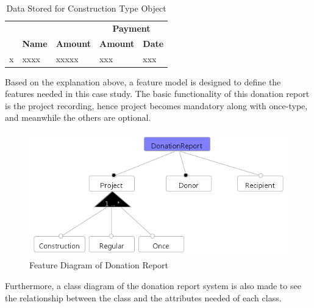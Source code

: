 \documentclass[runningheads,a4paper]{llncs}
\begin{document}
\begin{table}[]
	\centering
	\caption{Data Stored for Construction Type Object}
	\label{my-label}
	\begin{tabular}{|c|c|c|c|l|}
		\hline
		\rowcolor[HTML]{C0C0C0} 
		\cellcolor[HTML]{C0C0C0}                              & \cellcolor[HTML]{C0C0C0}                                & \cellcolor[HTML]{C0C0C0}                                  & \multicolumn{2}{c|}{\cellcolor[HTML]{C0C0C0}\textbf{Payment}}                         \\ \cline{4-5} 
		\rowcolor[HTML]{C0C0C0} 
		\multirow{-2}{*}{\cellcolor[HTML]{C0C0C0}\textbf{Id}} & \multirow{-2}{*}{\cellcolor[HTML]{C0C0C0}\textbf{Name}} & \multirow{-2}{*}{\cellcolor[HTML]{C0C0C0}\textbf{Amount}} & \textbf{Amount}          & \multicolumn{1}{c|}{\cellcolor[HTML]{C0C0C0}\textbf{Date}} \\ \hline
		\multicolumn{1}{|l|}{x}                               & \multicolumn{1}{l|}{xxxx}                               & \multicolumn{1}{l|}{xxxxx}                                & \multicolumn{1}{l|}{xxx} & xxx                                                        \\ \hline
	\end{tabular}
\end{table}

Based on the explanation above, a feature model is designed to define the features needed in this case study. The basic functionality of this donation report is the project recording, hence project becomes mandatory along with once-type, and meanwhile the others are optional.

\begin{figure}
	\centering
	\includegraphics[scale=0.65]{featureDiagram.png}
	\caption{Feature Diagram of Donation Report}
	\label{feature diagram}
\end{figure}

Furthermore, a class diagram of the donation report system is also made to see the relationship between the class and the attributes needed of each class. 
\end{document}
